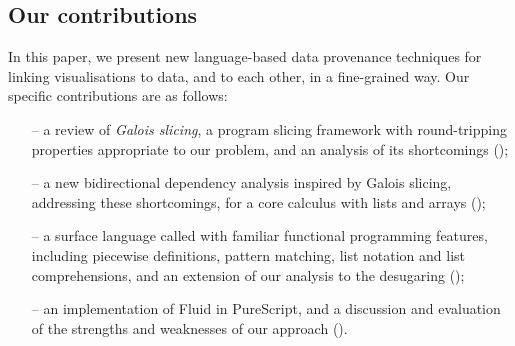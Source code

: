 \subsection{Our contributions}

In this paper, we present new language-based data provenance techniques for linking visualisations to data, and to each other, in a fine-grained way. Our specific contributions are as follows:

\begin{itemize}[leftmargin=*]
   \item[--] a review of \emph{Galois slicing}, a program slicing framework with round-tripping properties appropriate to our problem, and an analysis of its shortcomings ();
   \item[--] a new bidirectional dependency analysis inspired by Galois slicing, addressing these shortcomings, for a core calculus with lists and arrays ();
   \item[--] a surface language called \OurLanguage with familiar functional programming features, including piecewise definitions, pattern matching, list notation and list comprehensions, and an extension of our analysis to the desugaring ();
   \item[--] an implementation of Fluid in PureScript, and a discussion and evaluation of the strengths and weaknesses of our approach ().
\end{itemize}
